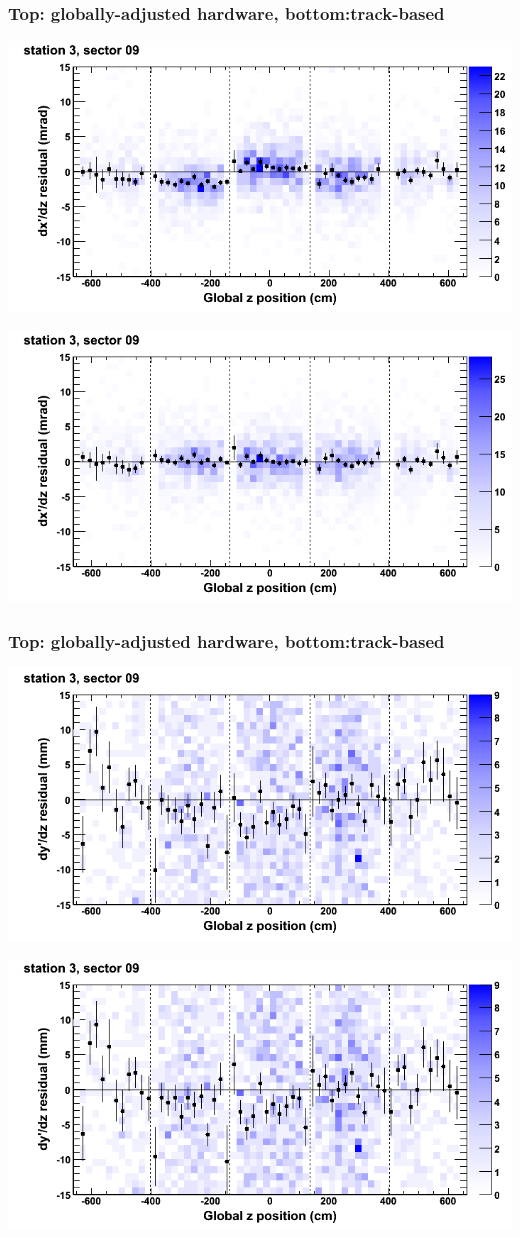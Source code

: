 \documentclass[compress]{beamer}
\begin{document}
\begin{frame}
\frametitle{Top: globally-adjusted hardware, bottom:track-based}
\includegraphics[width=0.7\linewidth]{NOV4_mapplots_HW/DTvsz_st3sec09_dxdz.png}

\includegraphics[width=0.7\linewidth]{NOV4_mapplots/DTvsz_st3sec09_dxdz.png}
\end{frame}

\begin{frame}
\frametitle{Top: globally-adjusted hardware, bottom:track-based}
\includegraphics[width=0.7\linewidth]{NOV4_mapplots_HW/DTvsz_st3sec09_dydz.png}

\includegraphics[width=0.7\linewidth]{NOV4_mapplots/DTvsz_st3sec09_dydz.png}
\end{frame}
\end{document}

